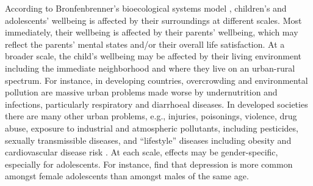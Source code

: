 \documentclass[10pt, letterpaper]{article}
\begin{document}
\begin{spacing}{1.4}
According to Bronfenbrenner's bioecological systems model
\citep{bronfenbrenner2007}, children's and adolescents' wellbeing is affected by
their surroundings at different scales. Most immediately, their wellbeing is
affected by their parents' wellbeing, which may reflect the parents' mental
states and/or their overall life satisfaction. At a broader scale, the child's
wellbeing may be affected by their living environment including the immediate
neighborhood and where they live on an urban-rural spectrum. 
 For instance, in developing countries, 
overcrowding and environmental pollution are massive urban problems made worse by
undernutrition and infections, particularly respiratory and diarrhoeal
diseases. In developed societies there are many other urban problems, e.g., injuries,
poisonings, violence, drug abuse, exposure to industrial and atmospheric
pollutants, including pesticides, sexually transmissible diseases, and
``lifestyle'' diseases including obesity and cardiovascular disease risk \citep{gracey2002child}.
At each scale, effects may be gender-specific, especially for adolescents. For
instance, \citet{nolen2016} find that depression is more common amongst female
adolescents than amongst males of the same age.


\end{spacing}
\end{document}
